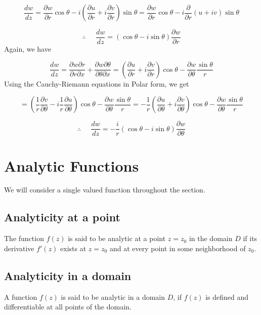 \[
\frac{dw}{dz}=\frac{\partial w}{\partial r}\cos\theta-i\left(\frac{\partial u}{\partial r}+i\frac{\partial v}{\partial r}\right)\sin\theta=\frac{\partial w}{\partial r}\cos\theta-i\frac{\partial}{\partial r}(u+iv)\sin\theta\]


\begin{equation}
\therefore\;\;\;\;\;\frac{dw}{dz}=(\cos\theta-i\sin\theta)\frac{\partial w}{\partial r}\label{eq:DP1}\end{equation}
Again, we have 

\[
\frac{dw}{dz}=\frac{\partial w\partial r}{\partial r\partial x}+\frac{\partial w\partial\theta}{\partial\theta\partial x}=\left(\frac{\partial u}{\partial r}+i\frac{\partial v}{\partial r}\right)\cos\theta-\frac{\partial w}{\partial\theta}\frac{\sin\theta}{r}\]
Using the Cauchy-Riemann equations in Polar form, we get

\[
=(\frac{1}{r}\frac{\partial v}{\partial\theta}-i\frac{1}{r}\frac{\partial u}{\partial\theta})\cos\theta-\frac{\partial w}{\partial\theta}\frac{\sin\theta}{r}=-\frac{1}{r}(\frac{\partial u}{\partial\theta}+i\frac{\partial v}{\partial\theta})\cos\theta-\frac{\partial w}{\partial\theta}\frac{\sin\theta}{r}\]


\begin{equation}
\therefore\;\;\;\;\;\frac{dw}{dz}=-\frac{i}{r}(\cos\theta-i\sin\theta)\frac{\partial w}{\partial\theta}\label{eq:DP2}\end{equation}

\section{Analytic Functions}
We will consider a single valued function throughout the section.
\subsection{Analyticity at a point}
The function $f(z)$ is said to be analytic  at a point $z=z_0$ in the domain $D$ if its derivative $f'(z)$ exists at $z=z_0$ and at every point in some neighborhood of $z_0$.
\subsection{Analyticity in a domain}
A function $f(z)$ is said to be analytic in a domain $D$, if $f(z)$ is defined and differentiable at all points of the domain.

